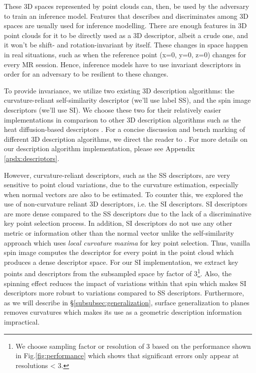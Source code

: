 These 3D spaces represented by point clouds can, then, be used by the adversary to train an inference model. Features that describes and discriminates among 3D spaces are usually used for inference modelling. There are enough features in 3D point clouds for it to be directly used as a 3D descriptor, albeit a crude one, and it won't be shift- and rotation-invariant by itself. These changes in space happen in real situations, such as when the reference point (x=0, y=0, z=0) changes for every MR session. Hence, inference models have to use invariant descriptors in order for an adversary to be resilient to these changes. 

To provide invariance, we utilize two existing 3D description algorithms: the curvature-reliant self-similarity descriptor \cite{huang2012point} (we'll use label SS), and the spin image descriptors \cite{johnson1998surface,johnson1999using} (we'll use SI). We choose these two for their relatively easier implementations in comparison to other 3D description algorithms such as the heat diffusion-based descriptors \cite{sun2009concise}. For a concise discussion and bench marking of different 3D description algorithms, we direct the reader to \cite{bronstein2010shrec}. For more details on our description algorithm implementation, please see Appendix \ref{apdx:descriptors}.%

\renewcommand*{\thefootnote}{\fnsymbol{footnote}}

However, curvature-reliant descriptors, such as the SS descriptors, are very sensitive to point cloud variations, due to the curvature estimation, especially when normal vectors are also to be estimated. To counter this, we explored the use of non-curvature reliant 3D descriptors, i.e. the SI descriptors. SI descriptors are more dense compared to the SS descriptors due to the lack of a discriminative key point selection process. In addition, SI descriptors do not use any other metric or information other than the normal vector unlike the self-similarity approach which uses \textit{local curvature maxima} for key point selection. Thus, vanilla spin image computes the descriptor for every point in the point cloud which produces a dense descriptor space. For our SI implementation, we extract key points and descriptors from the subsampled space by factor of 3\footnote[7]{We choose sampling factor or resolution of 3 based on the performance shown in Fig.\ref{fig:performance} which shows that significant errors only appear at resolutions < 3.}.
\renewcommand*{\thefootnote}{\arabic{footnote}}Also, the spinning effect reduces the impact of variations within that spin which makes SI descriptors more robust to variations compared to SS descriptors. Furthermore, as we will describe in \S\ref{subsubsec:generalization}, surface generalization to planes removes curvatures which makes its use as a geometric description information impractical.


